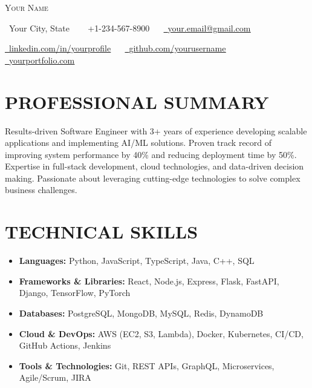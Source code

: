 \documentclass[letterpaper,11pt]{article}
\begin{document}
\begin{center}
    {\Huge \scshape \color{ACCENT_COLOR} Your Name} \\ \vspace{1pt}
    
    \raisebox{-0.1\height}\faMapMarker\ Your City, State 
    ~~
    \small \raisebox{-0.1\height}\faPhone\ +1-234-567-8900 
    ~~ 
    \href{mailto:your.email@gmail.com}{\raisebox{-0.1\height}\faEnvelope\  \underline{your.email@gmail.com}}
    \\ \vspace{2pt} 

    \href{https://linkedin.com/in/yourprofile}{\raisebox{-0.1\height}\faLinkedin\ \underline{linkedin.com/in/yourprofile}}  
    ~~
    \href{https://github.com/yourusername}{\raisebox{-0.1\height}\faGithub\ \underline{github.com/yourusername}}
    ~~
    \href{https://yourportfolio.com}{\raisebox{-0.1\height}\faGlobe\ \underline{yourportfolio.com}} 
    \vspace{-8pt}
\end{center}

\section{PROFESSIONAL SUMMARY}
Results-driven Software Engineer with 3+ years of experience developing scalable applications and implementing AI/ML solutions. Proven track record of improving system performance by 40\% and reducing deployment time by 50\%. Expertise in full-stack development, cloud technologies, and data-driven decision making. Passionate about leveraging cutting-edge technologies to solve complex business challenges.
\vspace{-2pt}

\section{TECHNICAL SKILLS}
\begin{itemize}[noitemsep, left=0pt]
    \item \textbf{Languages:} Python, JavaScript, TypeScript, Java, C++, SQL
    \item \textbf{Frameworks \& Libraries:} React, Node.js, Express, Flask, FastAPI, Django, TensorFlow, PyTorch
    \item \textbf{Databases:} PostgreSQL, MongoDB, MySQL, Redis, DynamoDB
    \item \textbf{Cloud \& DevOps:} AWS (EC2, S3, Lambda), Docker, Kubernetes, CI/CD, GitHub Actions, Jenkins
    \item \textbf{Tools \& Technologies:} Git, REST APIs, GraphQL, Microservices, Agile/Scrum, JIRA
\end{itemize}
\vspace{-13pt}
\end{document}
